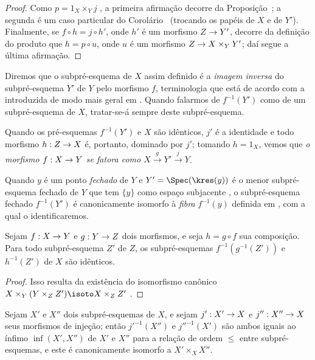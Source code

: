 \documentclass[oneside]{amsart}
\makeatletter
\renewcommand{\leq}{\leqslant}
\newcommand{\ega@arrow}[2]{\mathchoice{#1}{#2}{#2}{#2}}
\renewcommand{\to}{\ega@arrow{\longrightarrow}{\rightarrow}}
\newcommand{\oldpage}[2][]{{\marginnote{\normalfont\textbf{#1}~|~#2}}\ignorespaces}
\let\EGAOriginalLabel\label
\renewcommand{\label}[1]{\phantomsection\EGAOriginalLabel{#1}}
\makeatother
\begin{document}
\begin{proof}
Como $p=1_X\times_Y j$ , a primeira afirmação decorre da Proposição~;
a segunda é um caso particular do Corolário~ (trocando os papéis de $X$ e de $Y'$).
Finalmente, se $f\circ h=j\circ h'$, onde $h'$ é um morfismo $Z\to Y'$, decorre da definição do produto que $h=p\circ u$, onde $u$ é um morfismo $Z\to X\times_Y Y'$; daí segue a última afirmação.
\end{proof}

Diremos que o subpré-esquema de $X$ assim definido é a \emph{imagem inversa} do subpré-esquema $Y'$ de $Y$ pelo morfismo $f$, terminologia que está de acordo com a introduzida
\oldpage[I]{126}
de modo mais geral em .
Quando falarmos de $f^{-1}(Y')$ como de um subpré-esquema de $X$, tratar-se-á sempre deste subpré-esquema.

Quando os pré-esquemas $f^{-1}(Y')$ e $X$ são idênticos, $j'$ é a identidade e todo morfismo $h:Z\to X$ é, portanto, dominado por $j'$; tomando $h=1_X$, vemos que \emph{o morfismo $f:X\to Y$ se fatora como $X\xrightarrow{g}Y'\xrightarrow{j}Y$}.

Quando $y$ é um ponto \emph{fechado} de $Y$ e $Y'=\Spec(\kres(y))$ é o menor subpré-esquema fechado de $Y$ que tem $\{y\}$ como espaço subjacente , o subpré-esquema fechado $f^{-1}(Y')$ é canonicamente isomorfo à \emph{fibra} $f^{-1}(y)$ definida em , com a qual o identificaremos.

\begin{corollary}[4.4.2]
\label{I.4.4.2}
Sejam $f:X\to Y$ e $g:Y\to Z$ dois morfismos, e seja $h=g\circ f$ sua composição.
Para todo subpré-esquema $Z'$ de $Z$, os subpré-esquemas $f^{-1}(g^{-1}(Z'))$ e $h^{-1}(Z')$ de $X$ são idênticos.
\end{corollary}

\begin{proof}
Isso resulta da existência do isomorfismo canônico $X\times_Y(Y\times_Z Z')\isoto X\times_Z Z'$ .
\end{proof}

\begin{corollary}[4.4.3]
\label{I.4.4.3}
Sejam $X'$ e $X''$ dois subpré-esquemas de $X$, e sejam $j':X'\to X$ e $j'':X''\to X$ seus morfismos de injeção;
então ${j'}^{-1}(X'')$ e ${j''}^{-1}(X')$ são ambos iguais ao ínfimo $\inf(X',X'')$ de $X'$ e $X''$ para a relação de ordem $\leq$ entre subpré-esquemas, e este é canonicamente isomorfo a $X'\times_X X''$.
\end{corollary}
\end{document}
